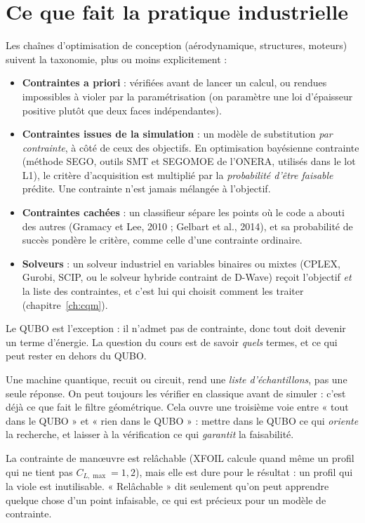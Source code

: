 \section{Ce que fait la pratique industrielle}
Les chaînes d'optimisation de conception (aérodynamique, structures, moteurs) suivent la taxonomie, plus ou moins explicitement :
\begin{itemize}
\item \textbf{Contraintes a priori} : vérifiées avant de lancer un calcul, ou rendues impossibles à violer par la paramétrisation (on paramètre une loi d'épaisseur positive plutôt que deux faces indépendantes).
\item \textbf{Contraintes issues de la simulation} : un modèle de substitution \emph{par contrainte}, à côté de ceux des objectifs. En optimisation bayésienne contrainte (méthode SEGO, outils SMT et SEGOMOE de l'ONERA, utilisés dans le lot L1), le critère d'acquisition est multiplié par la \emph{probabilité d'être faisable} prédite. Une contrainte n'est jamais mélangée à l'objectif.
\item \textbf{Contraintes cachées} : un classifieur sépare les points où le code a abouti des autres (Gramacy et Lee, 2010 ; Gelbart et al., 2014), et sa probabilité de succès pondère le critère, comme celle d'une contrainte ordinaire.
\item \textbf{Solveurs} : un solveur industriel en variables binaires ou mixtes (CPLEX, Gurobi, SCIP, ou le solveur hybride contraint de D-Wave) reçoit l'objectif \emph{et} la liste des contraintes, et c'est lui qui choisit comment les traiter (chapitre~\ref{ch:cqm}).
\end{itemize}
Le QUBO est l'exception : il n'admet pas de contrainte, donc tout doit devenir un terme d'énergie. La question du cours est de savoir \emph{quels} termes, et ce qui peut rester en dehors du QUBO.

\begin{projet}
Une machine quantique, recuit ou circuit, rend une \emph{liste d'échantillons}, pas une seule réponse. On peut toujours les vérifier en classique avant de simuler : c'est déjà ce que fait le filtre géométrique. Cela ouvre une troisième voie entre « tout dans le QUBO » et « rien dans le QUBO » : mettre dans le QUBO ce qui \emph{oriente} la recherche, et laisser à la vérification ce qui \emph{garantit} la faisabilité.
\end{projet}

\begin{piege}
La contrainte de manœuvre est relâchable (XFOIL calcule quand même un profil qui ne tient pas $C_{L,\max}=1{,}2$), mais elle est dure pour le résultat : un profil qui la viole est inutilisable. « Relâchable » dit seulement qu'on peut apprendre quelque chose d'un point infaisable, ce qui est précieux pour un modèle de contrainte.
\end{piege}

